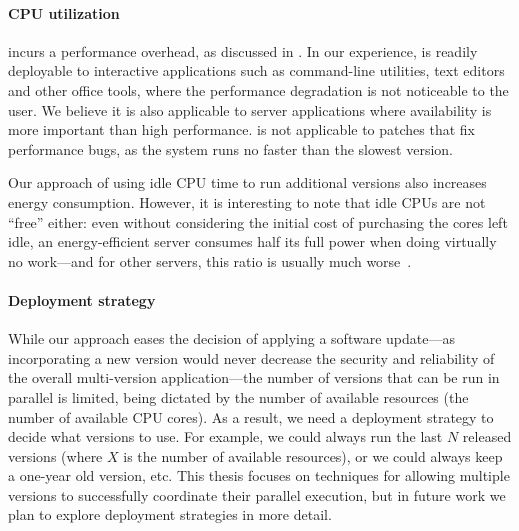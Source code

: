 
\paragraph{CPU utilization} \mx incurs a performance overhead, as discussed in
.  In our experience, \mx is readily deployable to
interactive applications such as command-line utilities, text editors and other
office tools, where the performance degradation is not noticeable to the user.
We believe it is also applicable to server applications where availability is
more important than high performance.  \mx is not applicable to patches that
fix performance bugs, as the system runs no faster than the slowest
version.

Our approach of using idle CPU time to run additional versions also increases
energy consumption.  However, it is interesting to note that idle CPUs are not
``free'' either: even without considering the initial cost of purchasing the
cores left idle, an energy-efficient server consumes half its full power when
doing virtually no work---and for other servers, this ratio is usually much
worse~\cite{barroso2007}.

\paragraph{Deployment strategy} While our approach eases the decision of
applying a software update---as incorporating a new version would never
decrease the security and reliability of the overall multi-version
application---the number of versions that can be run in parallel is limited,
being dictated by the number of available resources (\eg the number of
available CPU cores).  As a result, we need a deployment strategy to decide
what versions to use.  For example, we could always run the last $N$ released
versions (where $X$ is the number of available resources), or we could always
keep a one-year old version, etc.  This thesis focuses on techniques for
allowing multiple versions to successfully coordinate their parallel execution,
but in future work we plan to explore deployment strategies in more detail.
